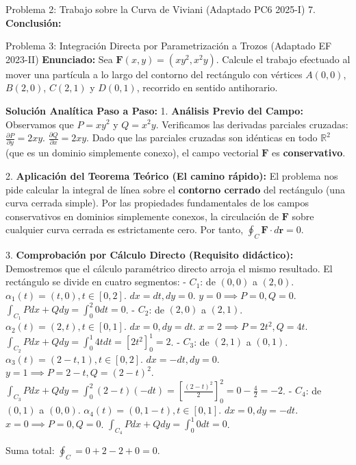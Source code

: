 \documentclass[11pt,a4paper]{article}
\begin{document}
\begin{ejerciciobox}{Problema 2: Trabajo sobre la Curva de Viviani (Adaptado PC6 2025-I)}
7. \textbf{Conclusión:}
\end{ejerciciobox}

\begin{ejerciciobox}{Problema 3: Integración Directa por Parametrización a Trozos (Adaptado EF 2023-II)}
\textbf{Enunciado:}
Sea $\mathbf{F}(x,y) = (xy^2, x^2 y)$. Calcule el trabajo efectuado al mover una partícula a lo largo del contorno del rectángulo con vértices $A(0,0)$, $B(2,0)$, $C(2,1)$ y $D(0,1)$, recorrido en sentido antihorario.

\textbf{Solución Analítica Paso a Paso:}
1. \textbf{Análisis Previo del Campo:}
Observamos que $P = xy^2$ y $Q = x^2 y$.
Verificamos las derivadas parciales cruzadas:
$\frac{\partial P}{\partial y} = 2xy$.
$\frac{\partial Q}{\partial x} = 2xy$.
Dado que las parciales cruzadas son idénticas en todo $\mathbb{R}^2$ (que es un dominio simplemente conexo), el campo vectorial $\mathbf{F}$ es \textbf{conservativo}.

2. \textbf{Aplicación del Teorema Teórico (El camino rápido):}
El problema nos pide calcular la integral de línea sobre el \textbf{contorno cerrado} del rectángulo (una curva cerrada simple).
Por las propiedades fundamentales de los campos conservativos en dominios simplemente conexos, la circulación de $\mathbf{F}$ sobre cualquier curva cerrada es estrictamente cero.
Por tanto, $\oint_C \mathbf{F} \cdot d\mathbf{r} = 0$.

3. \textbf{Comprobación por Cálculo Directo (Requisito didáctico):}
Demostremos que el cálculo paramétrico directo arroja el mismo resultado.
El rectángulo se divide en cuatro segmentos:
- $C_1$: de $(0,0)$ a $(2,0)$. $\alpha_1(t) = (t,0), t \in [0,2]$. $dx=dt, dy=0$. $y=0 \implies P=0, Q=0$.
  $\int_{C_1} P dx + Q dy = \int_0^2 0 dt = 0$.
- $C_2$: de $(2,0)$ a $(2,1)$. $\alpha_2(t) = (2,t), t \in [0,1]$. $dx=0, dy=dt$. $x=2 \implies P=2t^2, Q=4t$.
  $\int_{C_2} P dx + Q dy = \int_0^1 4t dt = \left[ 2t^2 \right]_0^1 = 2$.
- $C_3$: de $(2,1)$ a $(0,1)$. $\alpha_3(t) = (2-t,1), t \in [0,2]$. $dx=-dt, dy=0$. $y=1 \implies P=2-t, Q=(2-t)^2$.
  $\int_{C_3} P dx + Q dy = \int_0^2 (2-t)(-dt) = \left[ \frac{(2-t)^2}{2} \right]_0^2 = 0 - \frac{4}{2} = -2$.
- $C_4$: de $(0,1)$ a $(0,0)$. $\alpha_4(t) = (0,1-t), t \in [0,1]$. $dx=0, dy=-dt$. $x=0 \implies P=0, Q=0$.
  $\int_{C_4} P dx + Q dy = \int_0^1 0 dt = 0$.

Suma total: $\oint_C = 0 + 2 - 2 + 0 = 0$.

\end{ejerciciobox}
\end{document}
